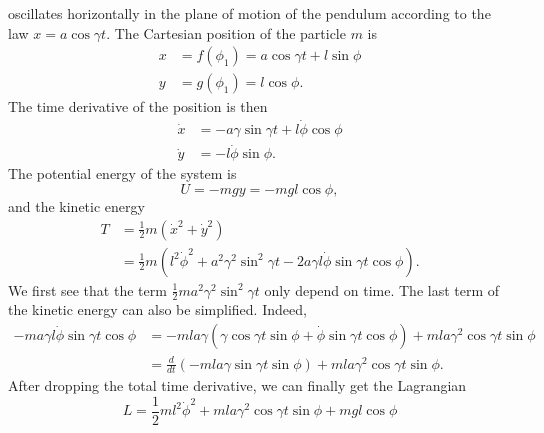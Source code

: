 \begin{subproblem}
{
oscillates horizontally in the plane of motion of the pendulum according to the law $x=a\cos{\gamma t}$.
}
{
The Cartesian position of the particle $m$ is
\begin{align*}
    x &= f(\phi_1) = a \cos{\gamma t} + l \sin{\phi} \\
    y &= g(\phi_1) = l \cos{\phi} .
\end{align*}
The time derivative of the position is then
\begin{align*}
    \Dot{x} &= -a \gamma \sin{\gamma t} + l \Dot{\phi} \cos{\phi} \\
    \Dot{y} &= - l \Dot{\phi} \sin{\phi} .
\end{align*}
The potential energy of the system is 
\begin{equation*}
    U = -mgy = -mgl\cos{\phi},
\end{equation*}
and the kinetic energy
\begin{align*}
    T &= \frac{1}{2} m (\Dot{x}^2 + \Dot{y}^2)\\
    &= \frac{1}{2} m \left(l^2\Dot{\phi}^2 + a^2\gamma^2\sin^2{\gamma t} - 2a\gamma l \Dot{\phi}\sin{\gamma t}\cos{\phi}\right).
\end{align*}
We first see that the term $\frac{1}{2} m a^2\gamma^2\sin^2{\gamma t}$ only depend on time. The last term of the kinetic energy can also be simplified. Indeed, 
\begin{align*}
      - m a\gamma l \Dot{\phi}\sin{\gamma t}\cos{\phi} &= 
      -m l a \gamma (\gamma \cos{\gamma t} \sin{\phi} + \Dot{\phi} \sin{\gamma t}\cos{\phi}) + m l a \gamma^2 \cos{\gamma t}\sin{\phi} \\
      &= \frac{d}{dt} \left( -mla\gamma\sin{\gamma t}\sin{\phi} \right) + m l a \gamma^2 \cos{\gamma t}\sin{\phi}.
\end{align*}
After dropping the total time derivative, we can finally get the Lagrangian
}
{
\begin{equation*}
    L = \frac{1}{2} m l^2\Dot{\phi}^2 + m l a \gamma^2 \cos{\gamma t}\sin{\phi}  + mgl\cos{\phi}
\end{equation*}
}
\end{subproblem}

